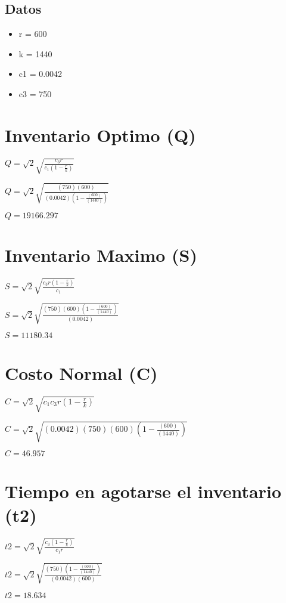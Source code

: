 \documentclass{article}
\newcommand*\rbreak{\par\noindent\linebreak}
\begin{document}
\subsection{\Huge Datos}
\begin{huge}
\begin{itemize}
\item r = 600
\item k = 1440
\item c1 = 0.0042
\item c3 = 750
\end{itemize}
\end{huge}\section{\Huge \Huge Inventario Optimo (Q)}
\begin{huge}
$Q = \sqrt{2} \sqrt{\frac{c_{3} r}{c_{1} \left(1 - \frac{r}{k}\right)}}$\rbreak
$Q = \sqrt{2} \sqrt{\frac{(750)  (600) }{(0.0042) \left(1 - \frac{ (600) }{ (1440) }\right)}}$\rbreak
$Q = 19166.297$
\end{huge}
\section{\Huge \Huge Inventario Maximo (S)}
\begin{huge}
$S = \sqrt{2} \sqrt{\frac{c_{3} r \left(1 - \frac{r}{k}\right)}{c_{1}}}$\rbreak
$S = \sqrt{2} \sqrt{\frac{(750)  (600)  \left(1 - \frac{ (600) }{ (1440) }\right)}{(0.0042)}}$\rbreak
$S = 11180.34$
\end{huge}
\section{\Huge \Huge Costo Normal (C)}
\begin{huge}
$C = \sqrt{2} \sqrt{c_{1} c_{3} r \left(1 - \frac{r}{k}\right)}$\rbreak
$C = \sqrt{2} \sqrt{(0.0042) (750)  (600)  \left(1 - \frac{ (600) }{ (1440) }\right)}$\rbreak
$C = 46.957$
\end{huge}
\section{\Huge \Huge Tiempo en agotarse el inventario (t2)}
\begin{huge}
$t2 = \sqrt{2} \sqrt{\frac{c_{3} \left(1 - \frac{r}{k}\right)}{c_{1} r}}$\rbreak
$t2 = \sqrt{2} \sqrt{\frac{(750) \left(1 - \frac{ (600) }{ (1440) }\right)}{(0.0042)  (600) }}$\rbreak
$t2 = 18.634$
\end{huge}
\end{document}
